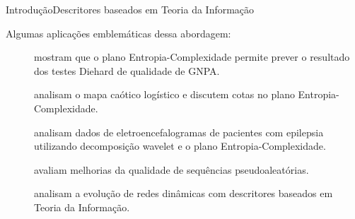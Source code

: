 \documentclass[10pt,xcolor={dvipsnames}]{beamer}
\begin{document}
\begin{frame}{Introdução}{Descritores baseados em Teoria da Informação}
\begin{block}{Algumas aplicações emblemáticas dessa abordagem:}
\begin{description}
	\item[\cite{RandomNumberGeneratorsCausality}] mostram que o plano Entropia-Complexidade permite prever o resultado dos testes Diehard de qualidade de GNPA.
	\item[\cite{GeneralizedStatisticalComplexityMeasuresGeometricalAnalyticalProperties}] analisam o mapa caótico logístico e discutem cotas no plano Entropia-Complexidade.
	\item[\cite{EEGAnalysisWaveletInformationTools}] analisam dados de eletroencefalogramas de pacientes com epilepsia 	utilizando decomposição wavelet e o plano Entropia-Complexidade.
	\item[\cite{De_Micco_2008}] avaliam melhorias da qualidade de sequências pseudoaleatórias.
	\item[\cite{ComplexNetworksEvolution}] analisam a evolução de redes dinâmicas com descritores baseados em Teoria da Informação.
\end{description}
\end{block}
\end{frame}
\end{document}
